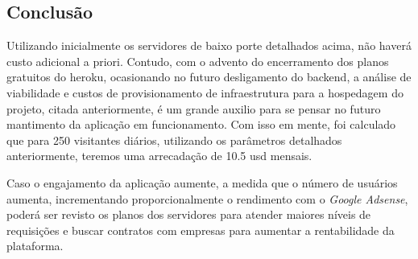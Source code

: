 \subsection{Conclusão}
Utilizando inicialmente os servidores de baixo porte detalhados acima, não haverá custo adicional a priori.
Contudo, com o advento do encerramento dos planos gratuitos do \gls{heroku}, ocasionando no futuro desligamento do \gls{backend}, a análise de viabilidade e custos de provisionamento de infraestrutura para a hospedagem do projeto, citada anteriormente, é um grande auxilio para se pensar no futuro mantimento da aplicação em funcionamento. Com isso em mente, foi calculado que para 250 visitantes diários, utilizando os parâmetros detalhados anteriormente, teremos uma arrecadação de 10.5 \acs{usd} mensais.

Caso o engajamento da aplicação aumente, a medida que o número de usuários aumenta,
incrementando proporcionalmente o rendimento com o \emph{Google Adsense}, poderá ser revisto os planos dos
servidores para atender maiores níveis de requisições e buscar contratos com empresas para aumentar 
a rentabilidade da plataforma.
